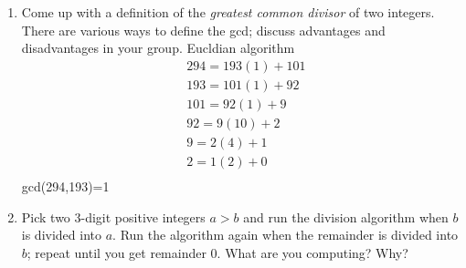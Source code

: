 \documentclass[11pt]{article}
\begin{document}
\begin{enumerate}
\begin{proof}
  Assuming that the divison problem this question is concerned with is dealing with integers then the argument of the divison algorithm states that there exists two unique integers q, and r representing the quotient and remainder of the divison. \\
  Some notes:\\
   - The integer divisor cannot be equal to zero as explained in problem 3. \\
   - The remainder must be greater than or equal to zero. \\
   - It does not make sense to have the remainder be greater than or equal to the divisor of the division operation occuring since it would be divided into a smaller remainder so it must be less than\\
   - The resulting quotient and remainder can be used to re-express the dividend.
   \\\\
   Expressed symbolically:
   Given two integers n and m $\in \mathbb{N}, m \neq 0$
   \[
     \exists ! \quad q,r \in \mathbb{N} : n= qm+r, 0 \leq r <b
   \]
   To prove this statement we will have to prove both existence and uniqueness.
   \textbf{Existence}:
  Let $ a \in \mathbb{N}$ and define a set A as :
  \[
    A=\{x\in \mathbb{N}:t(b)>a\}
  \]
  A is a nonempty subset of the natural numbers, thus by the well ordering principle there is a smallest element in A. Let $x_0$ be this smallest element.
  \begin{align*}
    &\text{Let }r=a-qb\\
    &a=qb+a-qb\\
  \end{align*}
  We now consider the case where
   \\\\
   \textbf{Uniqueness}
\end{proof}

\item Come up with a definition of the \emph{greatest common divisor} of two integers.
There are various ways to define the gcd; discuss advantages and disadvantages in your group.
Eucldian algorithm
\begin{align*}
&294=193(1)+101\\
&193=101(1)+92\\
&101=92(1)+9\\
&92=9(10)+2\\
&9=2(4)+1\\
&2=1(2)+0\\
\end{align*}
gcd(294,193)=1
\item Pick two 3-digit positive integers $a > b$ and run the division algorithm when $b$ is divided into $a$.
Run the algorithm again when the remainder is divided into $b$; repeat until you get remainder 0.
What are you computing? Why?


\end{enumerate}
\end{document}
